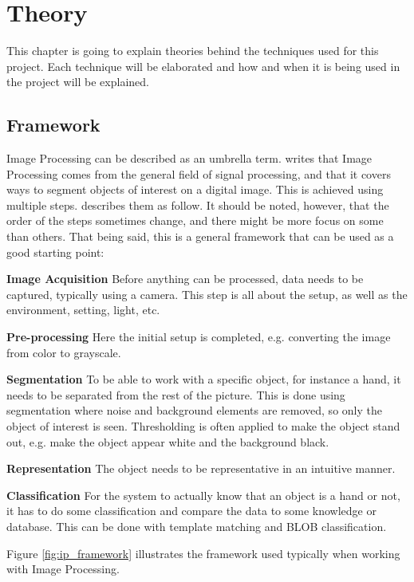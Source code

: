 \chapter{Theory}
This chapter is going to explain theories behind the techniques used for this project. Each technique will be elaborated and how and when it is being used in the project will be explained.


\section{Framework}
Image Processing can be described as an umbrella term. \citep{ip_book} writes that Image Processing comes from the general field of signal processing, and that it covers ways to segment objects of interest on a digital image. This is achieved using multiple steps. \citep{ip_book} describes them as follow. It should be noted, however, that the order of the steps sometimes change, and there might be more focus on some than others. That being said, this is a general framework that can be used as a good starting point:

\textbf{Image Acquisition}
Before anything can be processed, data needs to be captured, typically using a camera. This step is all about the setup, as well as the environment, setting, light, etc.

\textbf{Pre-processing}
Here the initial setup is completed, e.g. converting the image from color to grayscale.

\textbf{Segmentation}
To be able to work with a specific object, for instance a hand, it needs to be separated from the rest of the picture. This is done using segmentation where noise and background elements are removed, so only the object of interest is seen. Thresholding is often applied to make the object stand out, e.g. make the object appear white and the background black.

\textbf{Representation}
The object needs to be representative in an intuitive manner.

\textbf{Classification}
For the system to actually know that an object is a hand or not, it has to do some classification and compare the data to some knowledge or database. This can be done with template matching and BLOB classification.

Figure \eqref{fig:ip_framework} illustrates the framework used typically when working with Image Processing.

